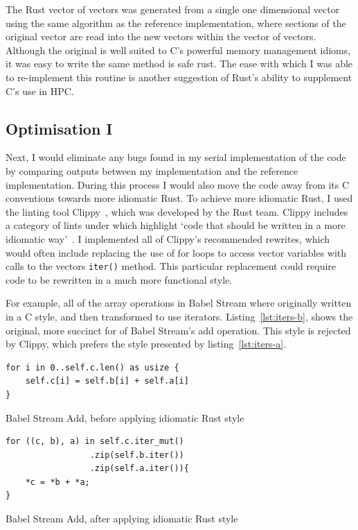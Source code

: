 The Rust vector of vectors was generated from a single one dimensional vector using the same algorithm as the reference implementation, where sections of the original vector are read into the new vectors within the vector of vectors. Although the original is well suited to C's powerful memory management idioms, it was easy to write the same method is safe rust. The ease with which I was able to re-implement this routine is another suggestion of Rust's ability to supplement C's use in HPC.

\subsection{Optimisation I}
Next, I would eliminate any bugs found in my serial implementation of the code by comparing outputs between my implementation and the reference implementation. During this process I would also move the code away from its C conventions towards more idiomatic Rust. To achieve more idiomatic Rust, I used the linting tool Clippy~\cite{RustClippy}, which was developed by the Rust team.  Clippy includes a category of lints under  which highlight `code that should be written in a more idiomatic way'~\cite{RustClippy}. I implemented all of Clippy's recommended rewrites, which would often include replacing the use of for loops to access vector variables with calls to the vectors \texttt{iter()} method. This particular replacement could require code to be rewritten in a much more functional style.

For example, all of the array operations in Babel Stream where originally written in a C style, and then transformed to use iterators. Listing~\ref{lst:iters-b}, shows the original, more succinct for of Babel Stream's add operation. This style is rejected by Clippy, which prefers the style presented by listing~\ref{lst:iters-a}.

\noindent\begin{minipage}{.45\textwidth}
    \begin{listing}[H]
    \label{lst:iters-b}
\begin{verbatim}
for i in 0..self.c.len() as usize {
    self.c[i] = self.b[i] + self.a[i]
}
\end{verbatim}
\caption{Babel Stream Add, before applying idiomatic Rust style}
\end{listing}
\end{minipage}\hfill
\begin{minipage}{.45\textwidth}
    \begin{listing}[H]
        \label{lst:iters-a}
\begin{verbatim}
for ((c, b), a) in self.c.iter_mut()
                 .zip(self.b.iter())
                 .zip(self.a.iter()){
    *c = *b + *a;
}
\end{verbatim}
\caption{Babel Stream Add, after applying idiomatic Rust style}
\end{listing}
\end{minipage}

